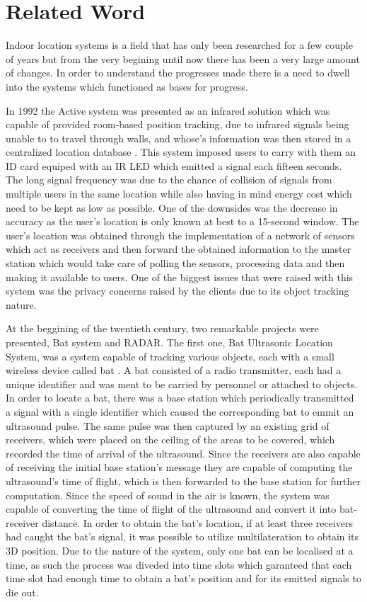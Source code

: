\documentclass[a4paper]{IEEEtran}
\begin{document}
\section{Related Word}
\label{sec:related}

Indoor location systems is a field that has only been researched for a few couple of years but from the very begining until now there has been a very large amount of changes. In order to understand the progresses made there is a need to dwell into the systems which functioned as bases for progress. 

In 1992 the Active system \cite{badge} was presented as an infrared solution which was capable of provided room-based position tracking, due to  infrared signals being unable to to travel through walls, and whose's information was then stored in a centralized location database \cite{badge1}. This system imposed users to carry with them an ID card equiped with an IR LED which emitted a signal each fifteen seconds. The long signal frequency was due to the chance of collision of signals from multiple users in the same location while also having in mind energy cost which need to be kept as low as possible. One of the downsides was the decrease in accuracy as the user's location is only known at best to a 15-second window. The user's location was obtained  through the implementation of a network of sensors which act as receivers and then forward the obtained information to the master station which would take care of polling the sensors, processing data and then making it available to users. One of the biggest issues that were raised with this system was the privacy concerns raised by the clients due to its object tracking nature.

At the beggining of the twentieth century, two remarkable projects were presented, Bat system \cite{bat} and RADAR\cite{radar}. The first one, Bat Ultrasonic Location System, was a system capable of tracking various objects, each with a small wireless device called bat \cite{bat1, bat2}. A bat consisted of a radio transmitter, each had a unique identifier and was ment to be carried by personnel or attached to objects. In order to locate a bat, there was a base station which periodically transmitted a signal with a single identifier which caused the corresponding bat to emmit an ultrasound pulse. The same pulse was then captured by an existing grid of receivers, which were placed on the ceiling of the areas to be covered, which recorded the time of arrival of the ultrasound. Since the receivers are also capable of receiving the initial base station's message they are capable of computing the ultrasound's time of flight, which is then forwarded to the base station for further computation. Since the speed of sound in the air is known, the system was capable of converting the time of flight of the ultrasound and convert it into bat-receiver distance. In order to obtain the bat's location, if at least three receivers had caught the bat's signal, it was possible to utilize multilateration to obtain its 3D position. Due to the nature of the system, only one bat can be localised at a time, as such	 the process was diveded into time slots which garanteed that each time slot had enough time to obtain a bat's position and for its emitted signals to die out.
\end{document}
